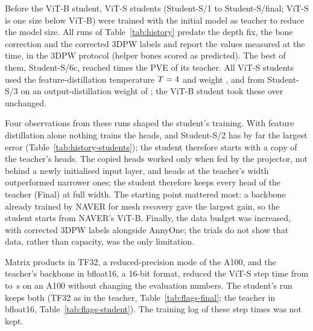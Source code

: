 Before the ViT-B student, ViT-S students (Student-S/1 to Student-S/final; ViT-S is one size below ViT-B) were trained
with the initial model as teacher to reduce the model size. All runs of Table~\ref{tab:history} predate the depth
fix, the bone correction and the corrected 3DPW labels and report the values measured at the time, in the 3DPW
protocol (helper bones scored as predicted). The best of them, Student-S/6c, reached \StudentSixcRatio{} times the PVE
of its teacher. All ViT-S students used the feature-distillation temperature $T=4$ and weight
\MethodKDLambda{}, and from Student-S/3 on an output-distillation weight of \MethodKDOutLambda; the ViT-B student took
these over unchanged.

Four observations from these runs shaped the student's training. With feature distillation alone nothing trains the
heads, and Student-S/2 has by far the largest error (Table~\ref{tab:history-students}); the student therefore starts
with a copy of the teacher's heads. The copied heads worked only when fed by the projector, not behind a newly
initialised input layer, and heads at the teacher's width outperformed narrower ones; the student therefore keeps every
head of the teacher (Final) at full width. The starting point mattered most: a backbone already trained by NAVER
for mesh recovery gave the largest gain, so the student starts from NAVER's ViT-B. Finally, the data budget was
increased, with corrected 3DPW labels alongside AnnyOne; the trials do not show that data, rather than capacity, was
the only limitation.

Matrix products in TF32, a reduced-precision mode of the A100, and the teacher's backbone in bfloat16, a 16-bit
format, reduced the ViT-S step time from \MethodItTimeBefore{} to \MethodItTimeAfter\,s on an A100 without changing
the evaluation numbers. The student's run
keeps both (TF32 as in the teacher, Table~\ref{tab:flags-final}; the teacher in bfloat16,
Table~\ref{tab:flags-student}). The training log of these step times was not kept.
